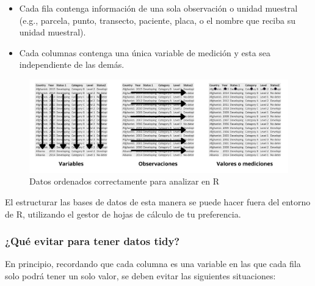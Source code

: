 \documentclass[
]{article}
\providecommand{\tightlist}{%
  \setlength{\itemsep}{0pt}\setlength{\parskip}{0pt}}
\theoremstyle{definition}
\theoremstyle{definition}
\theoremstyle{definition}
\theoremstyle{definition}
\theoremstyle{remark}
\begin{document}
\begin{itemize}
\tightlist
\item
  Cada fila contenga información de una sola observación o unidad muestral (e.g., parcela, punto, transecto, paciente, placa, o el nombre que reciba su unidad muestral).
\item
  Cada columnas contenga una única variable de medición y esta sea independiente de las demás.
\end{itemize}



\begin{figure}

{\centering \includegraphics[width=1\linewidth]{figs/elaboradas/datos tidy} 

}

\caption{Datos ordenados correctamente para analizar en R}\label{fig:figura51}
\end{figure}

El estructurar las bases de datos de esta manera se puede hacer fuera del entorno de R, utilizando el gestor de hojas de cálculo de tu preferencia.

\hypertarget{quuxe9-evitar-para-tener-datos-tidy}{%
\subsubsection{¿Qué evitar para tener datos tidy?}\label{quuxe9-evitar-para-tener-datos-tidy}}

En principio, recordando que cada columna es una variable en las que cada fila solo podrá tener un solo valor, se deben evitar las siguientes situaciones:
\end{document}
